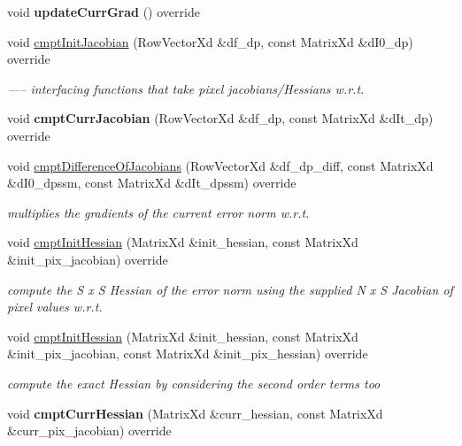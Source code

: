 \begin{DoxyCompactItemize}
\item 
\hypertarget{classNCC_a52efa5d7da27b81d74829cc221183da7}{void {\bfseries update\-Curr\-Grad} () override}\label{classNCC_a52efa5d7da27b81d74829cc221183da7}

\item 
void \hyperlink{classNCC_a9f0159354493cf53990cc08fa085818e}{cmpt\-Init\-Jacobian} (Row\-Vector\-Xd \&df\-\_\-dp, const Matrix\-Xd \&d\-I0\-\_\-dp) override
\begin{DoxyCompactList}\small\item\em ----- interfacing functions that take pixel jacobians/\-Hessians w.\-r.\-t. \end{DoxyCompactList}\item 
\hypertarget{classNCC_a28020e8ce1663b34f68fe83c67c8f830}{void {\bfseries cmpt\-Curr\-Jacobian} (Row\-Vector\-Xd \&df\-\_\-dp, const Matrix\-Xd \&d\-It\-\_\-dp) override}\label{classNCC_a28020e8ce1663b34f68fe83c67c8f830}

\item 
void \hyperlink{classNCC_a4e01b27a576bed42357556bc9e271eef}{cmpt\-Difference\-Of\-Jacobians} (Row\-Vector\-Xd \&df\-\_\-dp\-\_\-diff, const Matrix\-Xd \&d\-I0\-\_\-dpssm, const Matrix\-Xd \&d\-It\-\_\-dpssm) override
\begin{DoxyCompactList}\small\item\em multiplies the gradients of the current error norm w.\-r.\-t. \end{DoxyCompactList}\item 
void \hyperlink{classNCC_ab383e9bd34ceedc965b75d0f781d9db6}{cmpt\-Init\-Hessian} (Matrix\-Xd \&init\-\_\-hessian, const Matrix\-Xd \&init\-\_\-pix\-\_\-jacobian) override
\begin{DoxyCompactList}\small\item\em compute the S x S Hessian of the error norm using the supplied N x S Jacobian of pixel values w.\-r.\-t. \end{DoxyCompactList}\item 
\hypertarget{classNCC_ad80154cec219221284cc5e94a8d021aa}{void \hyperlink{classNCC_ad80154cec219221284cc5e94a8d021aa}{cmpt\-Init\-Hessian} (Matrix\-Xd \&init\-\_\-hessian, const Matrix\-Xd \&init\-\_\-pix\-\_\-jacobian, const Matrix\-Xd \&init\-\_\-pix\-\_\-hessian) override}\label{classNCC_ad80154cec219221284cc5e94a8d021aa}

\begin{DoxyCompactList}\small\item\em compute the exact Hessian by considering the second order terms too \end{DoxyCompactList}\item 
\hypertarget{classNCC_aea23ad8feb5021cb27a845a47b552bd1}{void {\bfseries cmpt\-Curr\-Hessian} (Matrix\-Xd \&curr\-\_\-hessian, const Matrix\-Xd \&curr\-\_\-pix\-\_\-jacobian) override}\label{classNCC_aea23ad8feb5021cb27a845a47b552bd1}


\end{DoxyCompactItemize}
